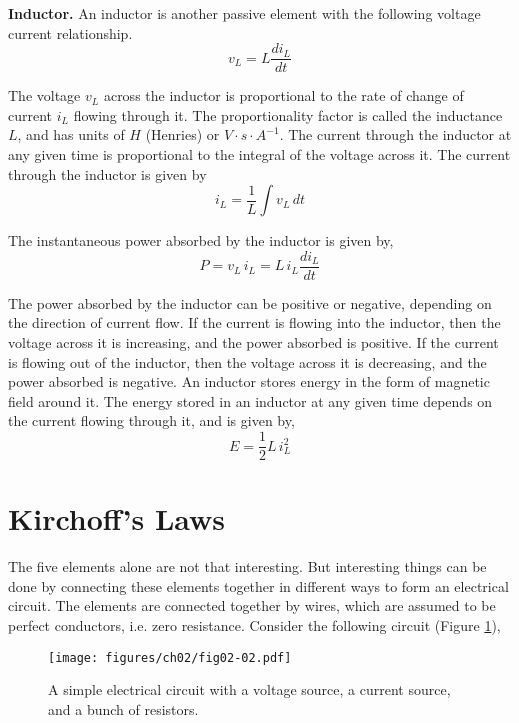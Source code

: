 \noindent \textbf{Inductor.} An inductor is another passive element with the following voltage current relationship.
\begin{equation}
    v_L = L \frac{di_L}{dt}
    \label{eq:02-07}
\end{equation}

The voltage $v_L$ across the inductor is proportional to the rate of change of current $i_L$ flowing through it. The proportionality factor is called the inductance $L$, and has units of $H$ (Henries) or $V \cdot s \cdot A^{-1}$. The current through the inductor at any given time is proportional to the integral of the voltage across it. The current through the inductor is given by
\begin{equation}
    i_L = \frac{1}{L} \int v_L \, dt
    \label{eq:02-08}
\end{equation}

The instantaneous power absorbed by the inductor is given by,
\begin{equation}
    P = v_L \, i_L = L \, i_L \frac{di_L}{dt}
    \label{eq:02-09}
\end{equation}

The power absorbed by the inductor can be positive or negative, depending on the direction of current flow. If the current is flowing into the inductor, then the voltage across it is increasing, and the power absorbed is positive. If the current is flowing out of the inductor, then the voltage across it is decreasing, and the power absorbed is negative. An inductor stores energy in the form of magnetic field around it. The energy stored in an inductor at any given time depends on the current flowing through it, and is given by,
\begin{equation}
    E = \frac{1}{2}  L \, i_L^2
    \label{eq:02-10}
\end{equation}

\section{Kirchoff's Laws}
The five elements alone are not that interesting. But interesting things can be done by connecting these elements together in different ways to form an electrical circuit. The elements are connected together by wires, which are assumed to be perfect conductors, i.e. zero resistance. Consider the following circuit (Figure \ref{fig:02-02}),
\begin{figure}[t]
    \centering
    \texttt{[image: figures/ch02/fig02-02.pdf]}
    \caption{A simple electrical circuit with a voltage source, a current source, and a bunch of resistors.}
    \label{fig:02-02}
\end{figure}

